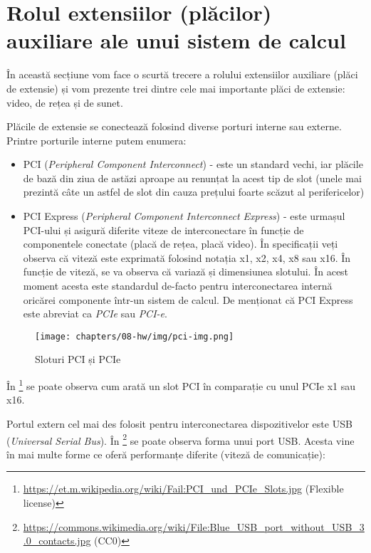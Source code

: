 \section{Rolul extensiilor (plăcilor) auxiliare ale unui sistem de calcul}
\label{sec:hw:extension}

În această secțiune vom face o scurtă trecere a rolului extensiilor auxiliare (plăci de extensie) și vom prezente trei dintre cele mai importante plăci de extensie: video, de rețea și de sunet.

Plăcile de extensie se conectează folosind diverse porturi interne sau externe.
 Printre porturile interne putem enumera:

\begin{itemize}
  \item PCI  (\textit{Peripheral Component Interconnect}) - este un standard vechi, iar plăcile de bază din ziua de astăzi aproape au renunțat la acest tip de slot (unele mai prezintă câte un astfel de slot din cauza prețului foarte scăzut al perifericelor)
  \item PCI Express (\textit{Peripheral Component Interconnect Express}) - este urmașul PCI-ului și asigură diferite viteze de interconectare în funcție de componentele conectate (placă de rețea, placă video).
    În specificații veți observa că viteză este exprimată folosind notația x1, x2, x4, x8 sau x16.
    În funcție de viteză, se va observa că variază și dimensiunea slotului.
    În acest moment acesta este standardul de-facto pentru interconectarea internă oricărei componente într-un sistem de calcul.
    De menționat că PCI Express este abreviat ca \textit{PCIe} sau \textit{PCI-e}.
\end{itemize}

\begin{figure}[!htbp]
  \centering
  \texttt{[image: chapters/08-hw/img/pci-img.png]}
  \caption{Sloturi PCI și PCIe}
  \label{fig:hw:pci}
\end{figure}

În \footnote{\url{https://et.m.wikipedia.org/wiki/Fail:PCI_und_PCIe_Slots.jpg} (Flexible license)} se poate observa cum arată un slot PCI în comparație cu unul PCIe x1 sau x16.

Portul extern cel mai des folosit pentru interconectarea dispozitivelor este USB (\textit{Universal Serial Bus}).
În \footnote{\url{https://commons.wikimedia.org/wiki/File:Blue_USB_port_without_USB_3.0_contacts.jpg} (CC0)} se poate observa forma unui port USB.
Acesta vine în mai multe forme ce oferă performanțe diferite (viteză de comunicație):


